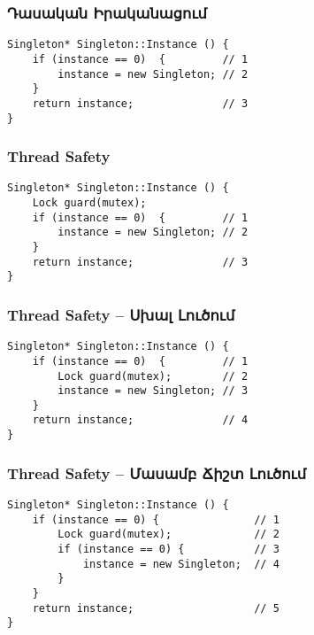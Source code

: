 \documentclass{beamer}
\begin{document}
\begin{frame}[fragile]\frametitle{Դասական Իրականացում}
\begin{english}
\begin{verbatim}
Singleton* Singleton::Instance () {
    if (instance == 0)  {         // 1
        instance = new Singleton; // 2
    }
    return instance;              // 3
}
\end{verbatim}
\end{english}
\end{frame}

\begin{frame}[fragile]\frametitle{Thread Safety}
\begin{english}
\begin{verbatim}
Singleton* Singleton::Instance () {
    Lock guard(mutex);
    if (instance == 0)  {         // 1
        instance = new Singleton; // 2
    }
    return instance;              // 3
}
\end{verbatim}
\end{english}
\end{frame}

\begin{frame}[fragile]\frametitle{Thread Safety – Սխալ Լուծում}
\begin{english}
\begin{verbatim}
Singleton* Singleton::Instance () {
    if (instance == 0)  {         // 1
        Lock guard(mutex);        // 2
        instance = new Singleton; // 3
    }
    return instance;              // 4
}
\end{verbatim}
\end{english}
\end{frame}

\begin{frame}[fragile]\frametitle{Thread Safety – Մասամբ Ճիշտ Լուծում}
\begin{english}
\begin{verbatim}
Singleton* Singleton::Instance () {
    if (instance == 0) {               // 1
        Lock guard(mutex);             // 2
        if (instance == 0) {           // 3
            instance = new Singleton;  // 4
        }
    }
    return instance;                   // 5
}
\end{verbatim}
\end{english}
\end{frame}
\end{document}
